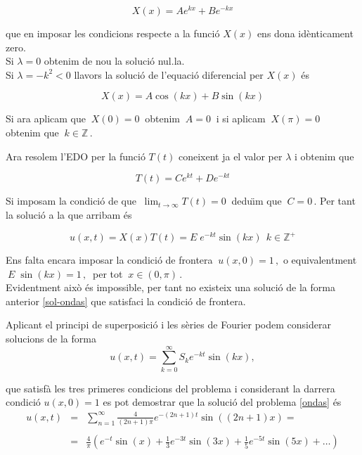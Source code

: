 \documentclass[12pt]{article}
\newcommand{\Z}{\mathbb{Z}}
\begin{document}
\[
 X(x)=Ae^{k x}+Be^{-kx}
\]

que en imposar les condicions respecte a la funci{\'o} $X(x)$ ens dona id{\`e}nticament zero.\\

Si $\lambda=0$ obtenim de nou la soluci{\'o} nul.la.\\

Si $\lambda=-k^2<0$ llavors la soluci{\'o} de l'equaci{\'o} diferencial per $X(x)$ {\'e}s

\[
 X(x)=A\cos(kx)+B\sin(kx)
\]

Si ara aplicam que $\ X(0)=0\ $ obtenim $\ A=0\ $ i si aplicam $\ X(\pi)=0\ $ obtenim que $\ k\in \Z\,.$

Ara resolem l'EDO per la funci{\'o} $T(t)$ coneixent ja el valor per $\lambda$ i obtenim que

\[
 T(t)=Ce^{kt}+De^{-kt}
\]

Si imposam la condici{\'o} de que $\ \displaystyle\lim_{t\to\infty}T(t)=0\ $ dedu{\"\i}m que $\ C=0\,.$ Per tant la soluci{\'o} a la que arribam {\'e}s

\begin{equation}\label{sol-ondas}
 u(x,t)=X(x)T(t)=E\;e^{-kt}\sin(kx)\ \ k\in \Z^+
\end{equation}

Ens falta encara imposar la condici{\'o} de frontera $\ u(x,0)=1\,,$ o equivalentment\\

 $\ E\;\sin(kx)=1\,,\ $ per tot $\ x\in(0,\pi)\,.$\\


Evidentment aix{\`o} {\'e}s impossible, per tant no existeix una soluci{\'o} de la
forma anterior \eqref{sol-ondas} que satisfaci la condici{\'o} de frontera.

Aplicant el principi de superposici{\'o} i les s{\`e}ries de Fourier podem considerar solucions de la forma
\[
 u(x,t)=\sum_{k=0}^\infty S_k e^{-k t}\sin(kx),
\]

que satisf{\`a} les tres primeres condicions del problema i considerant la darrera condici{\'o} $u(x,0)=1$ es pot demostrar que la soluci{\'o} del problema \eqref{ondas} {\'e}s
\begin{eqnarray*}
 u(x,t)&=&\displaystyle\sum_{n=1}^\infty\frac{4}{(2n+1)\pi} e^{-(2n+1)t}\sin((2n+1)x)=\\
 \\
&=&\displaystyle\frac{4}{\pi}\left(e^{-t}\sin(x)+\frac{1}{3}e^{-3t}\sin(3x)+\frac{1}{5}e^{-5t}\sin(5x)+\ldots\right)
\end{eqnarray*}
\end{document}
